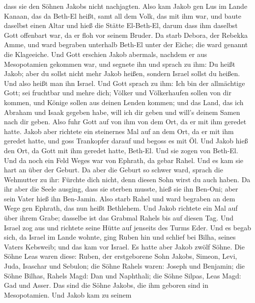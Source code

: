 dass sie den Söhnen Jakobs nicht nachjagten.  Also kam Jakob
gen Lus im Lande Kanaan, das da Beth-El heißt, samt all dem Volk, das
mit ihm war,  und baute daselbst einen Altar und hieß die
Stätte El-Beth-El, darum dass ihm daselbst Gott offenbart war, da er
floh vor seinem Bruder.  Da starb Debora, der Rebekka Amme,
und ward begraben unterhalb Beth-El unter der Eiche; die ward genannt
die Klageeiche.  Und Gott erschien Jakob abermals, nachdem
er aus Mesopotamien gekommen war, und segnete ihn  und
sprach zu ihm: Du heißt Jakob; aber du sollst nicht mehr Jakob heißen,
sondern Israel sollst du heißen. Und also heißt man ihn Israel.
 Und Gott sprach zu ihm: Ich bin der allmächtige Gott; sei
fruchtbar und mehre dich; Völker und Völkerhaufen sollen von dir kommen,
und Könige sollen aus deinen Lenden kommen;  und das Land,
das ich Abraham und Isaak gegeben habe, will ich dir geben und will's
deinem Samen nach dir geben.  Also fuhr Gott auf von ihm
von dem Ort, da er mit ihm geredet hatte.  Jakob aber
richtete ein steinernes Mal auf an dem Ort, da er mit ihm geredet hatte,
und goss Trankopfer darauf und begoss es mit Öl.  Und Jakob
hieß den Ort, da Gott mit ihm geredet hatte, Beth-El.  Und
sie zogen von Beth-El. Und da noch ein Feld Weges war von Ephrath, da
gebar Rahel.  Und es kam sie hart an über der Geburt. Da
aber die Geburt so schwer ward, sprach die Wehmutter zu ihr: Fürchte
dich nicht, denn diesen Sohn wirst du auch haben.  Da ihr
aber die Seele ausging, dass sie sterben musste, hieß sie ihn Ben-Oni;
aber sein Vater hieß ihn Ben-Jamin.  Also starb Rahel und
ward begraben an dem Wege gen Ephrath, das nun heißt Bethlehem.
 Und Jakob richtete ein Mal auf über ihrem Grabe; dasselbe
ist das Grabmal Rahels bis auf diesen Tag.  Und Israel zog
aus und richtete seine Hütte auf jenseits des Turms Eder. 
Und es begab sich, da Israel im Lande wohnte, ging Ruben hin und schlief
bei Bilha, seines Vaters Kebsweib; und das kam vor Israel. Es hatte aber
Jakob zwölf Söhne.  Die Söhne Leas waren diese: Ruben, der
erstgeborene Sohn Jakobs, Simeon, Levi, Juda, Isaschar und Sebulon;
 die Söhne Rahels waren: Joseph und Benjamin; 
die Söhne Bilhas, Rahels Magd: Dan und Naphthali;  die
Söhne Silpas, Leas Magd: Gad und Asser. Das sind die Söhne Jakobs, die
ihm geboren sind in Mesopotamien.  Und Jakob kam zu seinem
